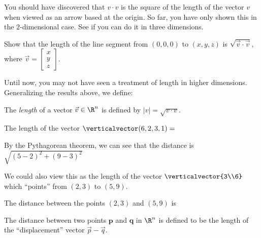 \documentclass{ximera}
\begin{document}
You should have discovered that $v\cdot v$ is the square of the length
of the vector $v$ when viewed as an arrow based at the origin.  So
far, you have only shown this in the $2$-dimensional case.  See if you
can do it in three dimensions.

Show that the length of the line segment from $(0,0,0)$ to $(x,y,z)$
is $\sqrt{\vec{v} \cdot \vec{v}}$, where $\vec{v} = \begin{bmatrix} x
  \\ y \\ z\end{bmatrix}$.

\begin{free-response}
  
\end{free-response}

Until now, you may not have seen a treatment of length in higher
dimensions.  Generalizing the results above, we define:

\begin{definition}
  The \textit{length} of a vector $\vec{v} \in \R^n$ is defined by $|v| = \sqrt{v \cdot v}$.
\end{definition}

\begin{question}
  \begin{solution}
    The length of the vector $\verticalvector(6,2,3,1)=$ 
  \end{solution}
\end{question}

\begin{question}
  \begin{solution}
    \begin{hint}
      By the Pythagorean theorem, we can see that  the distance is $\sqrt{(5-2)^2+(9-3)^2}$
    \end{hint}
    \begin{hint}
      We could also view this as the length of the vector $\verticalvector{3\\6}$ which ``points'' from $(2,3)$ to $(5,9)$.
    \end{hint}
    The distance between the points $(2,3)$ and $(5,9)$ is 
  \end{solution}
\end{question}

\begin{definition}
  The distance between two points $\mathbf{p}$ and $\mathbf{q}$ in $\R^n$ is defined to be the length of the ``displacement'' vector $\vec{p} - \vec{q}$.
\end{definition}
\end{document}
